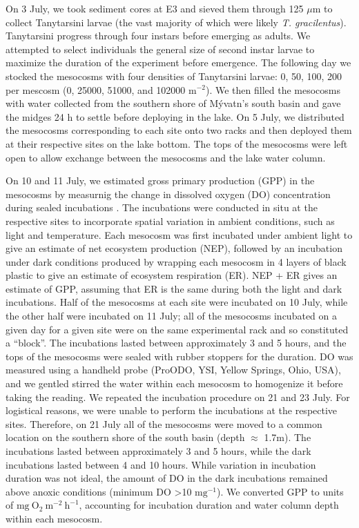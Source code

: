 On 3 July, 
we took sediment cores at E3 and sieved them through 125 $\mu \text{m}$
to collect Tanytarsini larvae (the vast majority of which were likely \emph{T. gracilentus}).
Tanytarsini progress through four instars before emerging as adults.
We attempted to select individuals the general size of second instar larvae
to maximize the duration of the experiment before emergence.
The following day we stocked the mesocosms with four densities of Tanytarsini larvae:
0, 50, 100, 200 per mescosm (0, 25000, 51000, and 102000 $\text{m}^{-2}$). 
We then filled the mesocosms with water collected from the southern shore of M\'{y}vatn's
south basin and gave the midges 24 h to settle before deploying in the lake.
On 5 July, 
we distributed the mesocosms corresponding to each site onto two racks and then
deployed them at their respective sites on the lake bottom.
The tops of the mesocosms were left open to allow exchange between the mesocosms
and the lake water column.

On 10 and 11 July, 
we estimated gross primary production (GPP) in the mesocosms by measurnig the change in
dissolved oxygen (DO) concentration during sealed incubations \citep{hall2017}.
The incubations were conducted in situ at the respective sites to incorporate
spatial variation in ambient conditions, such as light and temperature.
Each mesocosm was first incubated under ambient light to give an
estimate of net ecosystem production (NEP),
followed by an incubation under dark conditions produced by wrapping each mesocosm 
in 4 layers of black plastic to give an estimate of ecosystem respiration (ER).
NEP + ER gives an estimate of GPP, assuming that ER is the same during both the light
and dark incubations. Half of the mesocosms at each site were incubated on 10 July,
while the other half were incubated on 11 July;
all of the mesocosms incubated on a given day for a given site were on the same 
experimental rack and so constituted a ``block''.
The incubations lasted between approximately 3 and 5 hours, 
and the tops of the mesocosms were sealed with rubber stoppers for the duration.
DO was measured using a handheld probe (ProODO, YSI, Yellow Springs, Ohio, USA),
and we gentled stirred the water within each mesocosm to homogenize it 
before taking the reading. 
We repeated the incubation procedure on 21 and 23 July.
For logistical reasons, we were unable to perform the incubations at the respective sites.
Therefore, on 21 July all of the mesocosms were moved to a common location on the
southern shore of the south basin (depth $\approx$ 1.7m).
The incubations lasted between approximately 3 and 5 hours,
while the dark incubations lasted between 4 and 10 hours.
While variation in incubation duration was not ideal,
the amount of DO in the dark incubations remained above anoxic conditions 
(minimum DO >10 $\text{mg}^{-1}$). 
We converted GPP to units of $\text{mg}~\text{O}_2~\text{m}^{-2}~\text{h}^{-1}$,
accounting for incubation duration and water column depth within each mesocosm.

